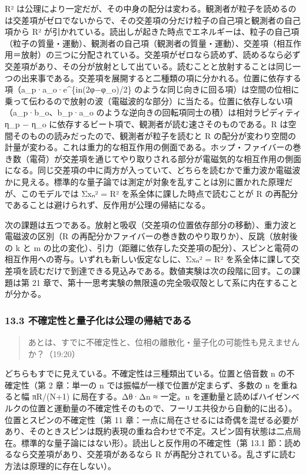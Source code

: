 \documentclass[
  a4paper,
]{ltjsarticle}
\begin{document}
R²
は公理により一定だが、その中身の配分は変わる。観測者が粒子を読めるのは交差項がゼロでないからで、その交差項の分だけ粒子の自己項と観測者の自己項から
R²
が引かれている。読出しが起きた時点でエネルギーは、粒子の自己項（粒子の質量・運動）、観測者の自己項（観測者の質量・運動）、交差項（相互作用＝放射）の三つに分配されている。交差項がゼロなら読めず、読めるなら必ず交差項があり、その分が放射として出ている。読むことと放射することは同じ一つの出来事である。交差項を展開すると二種類の項に分かれる。位置に依存する項（a\_p·a\_o·e\^{}\{in(2φ−φ\_o)/2\}
のような同じ向きに回る項）は空間の位相に乗って伝わるので放射の波（電磁波的な部分）に当たる。位置に依存しない項（a\_p·b\_o、b\_p·a\_o
のような逆向きの回転項同士の積）は相対ラピディティ η\_p − η\_o
に依存するビート項で、観測者が読む速さそのものである。R
は空間そのものの読みだったので、観測者が粒子を読むと R
の配分が変わり空間の計量が変わる。これは重力的な相互作用の側面である。ホップ・ファイバーの巻き数（電荷）が交差項を通じてやり取りされる部分が電磁気的な相互作用の側面になる。同じ交差項の中に両方が入っていて、どちらを読むかで重力波か電磁波かに見える。標準的な量子論では測定が対象を乱すことは別に置かれた原理だが、このモデルでは
Σxₙ² = R² を系全体に課した時点で読むことが R
の再配分であることは避けられず、反作用が公理の帰結になる。

次の課題は五つである。放射と吸収（交差項の位置依存部分の移動）、重力波と電磁波の区別（R
の再配分かファイバーの巻き数のやり取りか）、反跳（放射後の k と m
の比の変化）、引力（距離に依存した交差項の配分）、スピンと電荷の相互作用への寄与。いずれも新しい仮定なしに、Σxₙ²
= R²
を系全体に課して交差項を読むだけで到達できる見込みである。数値実験は次の段階に回す。この課題は第
21
章で、第十一思考実験の無限遠の完全吸収殻として系に内在することが分かる。

\subsubsection{13.3
不確定性と量子化は公理の帰結である}\label{ux4e0dux78baux5b9aux6027ux3068ux91cfux5b50ux5316ux306fux516cux7406ux306eux5e30ux7d50ux3067ux3042ux308b}

\begin{quote}
あとは、すでに不確定性と、位相の離散化・量子化の可能性も見えませんか？（19:20）
\end{quote}

どちらもすでに見えている。不確定性は三種類出ている。位置と倍音数 n
の不確定性（第 2 章：単一の n では振幅が一様で位置が定まらず、多数の n
を重ねると幅 πR/(N+1) に局在する。Δθ·Δn ≈ 一定。n
を運動量と読めばハイゼンベルクの位置と運動量の不確定性そのもので、フーリエ共役から自動的に出る）。位置とスピンの不確定性（第
11
章：一点に局在させるには奇偶を混ぜる必要があり、そのときスピンは既約表現の重ね合わせで不定。スピン固有状態は二点局在。標準的な量子論にはない形）。読出しと反作用の不確定性（第
13.1 節：読めるなら交差項があり、交差項があるなら R
が再配分されている。乱さずに読む方法は原理的に存在しない）。
\end{document}
